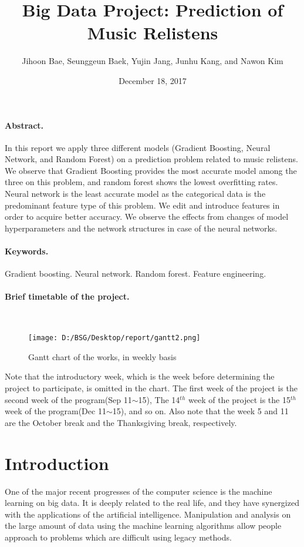 \documentclass{article}
\date{December 18, 2017}
\title{{\bf Big Data Project: Prediction of Music Relistens}}
\author{Jihoon Bae, Seunggeun Baek, Yujin Jang, Junhu Kang, and Nawon Kim}
\begin{document}
\maketitle
\paragraph{Abstract.}
In this report we apply three
different models (Gradient Boosting, Neural Network, and Random Forest) on a
prediction problem related to music relistens. We observe that Gradient Boosting
provides the most accurate model among the three on this problem, and random forest shows the lowest
overfitting rates. Neural network is the least accurate model as the categorical
data is the predominant feature type of this problem. We edit and introduce features in order to acquire better accuracy. We
observe the effects from changes of model hyperparameters and the network structures in case
of the neural networks.
\paragraph{Keywords.} Gradient boosting. Neural network. Random forest. Feature
engineering.

\paragraph{Brief timetable of the project.}
\mbox{}\\

\begin{figure}[!h]
  \centering
  \texttt{[image: D:/BSG/Desktop/report/gantt2.png]}
  \caption{Gantt chart of the works, in weekly basis}
  \label{fig:gantt}
\end{figure}

Note that the introductory week, which is the week before determining the
project to participate, is omitted in the chart. The first week of the project
is the second week of the program(Sep 11$\sim$15), The 14$^{th}$ week of the
project is the 15$^{th}$ week of the program(Dec 11$\sim$15), and so on. Also
note that the week 5 and 11 are the October break and the Thanksgiving break,
respectively.

\newpage
\tableofcontents
\newpage
\section{Introduction}
One of the major recent progresses of the computer science is the machine
learning on big data. It is deeply related to the real life, and they
have synergized with the applications of the artificial intelligence.
Manipulation and analysis on the large amount of data using the machine learning
algorithms allow people approach to problems which are difficult using legacy
methods.
\end{document}
